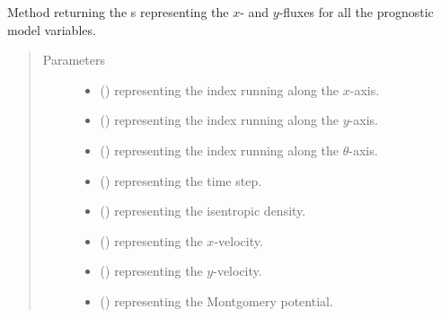 \documentclass[letterpaper,10pt,english]{sphinxmanual}
\begin{document}
\begin{fulllineitems}
\begin{fulllineitems}
\label{\detokenize{api:tasmania.dycore.flux_isentropic_nonconservative.FluxIsentropicNonconservative.get_horizontal_fluxes}}
Method returning the s representing the \(x\)- and \(y\)-fluxes
for all the prognostic model variables.
\begin{quote}\begin{description}
\item[{Parameters}] \leavevmode\begin{itemize}
\item {} 
 () \textendash{}  representing the index running along the \(x\)-axis.

\item {} 
 () \textendash{}  representing the index running along the \(y\)-axis.

\item {} 
 () \textendash{}  representing the index running along the \(\theta\)-axis.

\item {} 
 () \textendash{}  representing the time step.

\item {} 
 () \textendash{}  representing the isentropic density.

\item {} 
 () \textendash{}  representing the \(x\)-velocity.

\item {} 
 () \textendash{}  representing the \(y\)-velocity.

\item {} 
 () \textendash{}  representing the Montgomery potential.


\end{itemize}
\end{description}
\end{quote}
\end{fulllineitems}
\end{fulllineitems}
\end{document}
